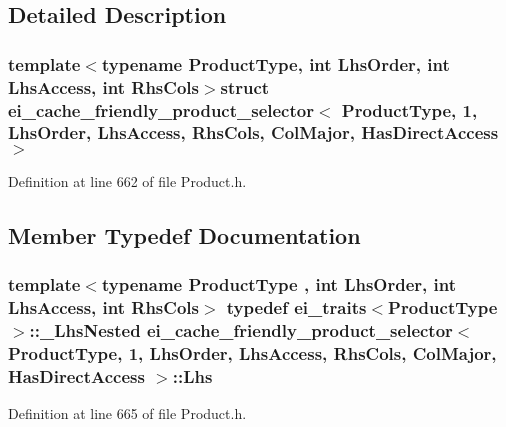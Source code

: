 \subsection{Detailed Description}
\subsubsection*{template$<$typename Product\-Type, int Lhs\-Order, int Lhs\-Access, int Rhs\-Cols$>$struct ei\-\_\-cache\-\_\-friendly\-\_\-product\-\_\-selector$<$ Product\-Type, 1, Lhs\-Order, Lhs\-Access, Rhs\-Cols, Col\-Major, Has\-Direct\-Access $>$}



Definition at line 662 of file Product.\-h.



\subsection{Member Typedef Documentation}
\hypertarget{structei__cache__friendly__product__selector_3_01_product_type_00_011_00_01_lhs_order_00_01_lhs_7baad95154c59093f09d002bad31c6a0_a495829a2927358ebeb2a208fbbc0b648}{
\subsubsection[{Lhs}]{\setlength{\rightskip}{0pt plus 5cm}template$<$typename Product\-Type , int Lhs\-Order, int Lhs\-Access, int Rhs\-Cols$>$ typedef {\bf ei\-\_\-traits}$<$Product\-Type$>$\-::\-\_\-\-Lhs\-Nested {\bf ei\-\_\-cache\-\_\-friendly\-\_\-product\-\_\-selector}$<$ Product\-Type, 1, Lhs\-Order, Lhs\-Access, Rhs\-Cols, {\bf Col\-Major}, {\bf Has\-Direct\-Access} $>$\-::{\bf Lhs}}}\label{structei__cache__friendly__product__selector_3_01_product_type_00_011_00_01_lhs_order_00_01_lhs_7baad95154c59093f09d002bad31c6a0_a495829a2927358ebeb2a208fbbc0b648}


Definition at line 665 of file Product.\-h.

